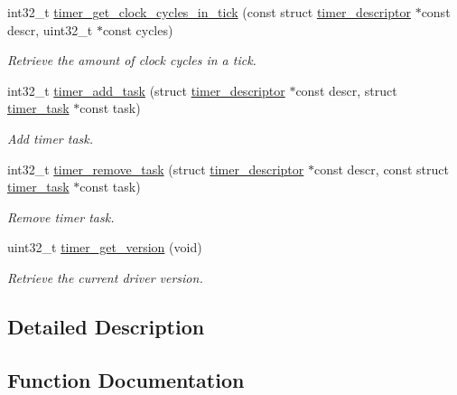 \begin{DoxyCompactItemize}
int32\+\_\+t \hyperlink{group__doc__driver__hal__timer_gadfb41242ed524d44676ef469b6e4d8ba}{timer\+\_\+get\+\_\+clock\+\_\+cycles\+\_\+in\+\_\+tick} (const struct \hyperlink{structtimer__descriptor}{timer\+\_\+descriptor} $\ast$const descr, uint32\+\_\+t $\ast$const cycles)
\begin{DoxyCompactList}\small\item\em Retrieve the amount of clock cycles in a tick. \end{DoxyCompactList}\item 
int32\+\_\+t \hyperlink{group__doc__driver__hal__timer_ga6a3e13f52fc112ac1d11c2615044bdac}{timer\+\_\+add\+\_\+task} (struct \hyperlink{structtimer__descriptor}{timer\+\_\+descriptor} $\ast$const descr, struct \hyperlink{structtimer__task}{timer\+\_\+task} $\ast$const task)
\begin{DoxyCompactList}\small\item\em Add timer task. \end{DoxyCompactList}\item 
int32\+\_\+t \hyperlink{group__doc__driver__hal__timer_gad9ebc284902f8cc56872fe4c28c8f77e}{timer\+\_\+remove\+\_\+task} (struct \hyperlink{structtimer__descriptor}{timer\+\_\+descriptor} $\ast$const descr, const struct \hyperlink{structtimer__task}{timer\+\_\+task} $\ast$const task)
\begin{DoxyCompactList}\small\item\em Remove timer task. \end{DoxyCompactList}\item 
uint32\+\_\+t \hyperlink{group__doc__driver__hal__timer_ga0d15eccf64f5a468c2f359286a2d6682}{timer\+\_\+get\+\_\+version} (void)
\begin{DoxyCompactList}\small\item\em Retrieve the current driver version. \end{DoxyCompactList}\end{DoxyCompactItemize}


\subsection{Detailed Description}


\subsection{Function Documentation}
\mbox{\label{group__doc__driver__hal__timer_ga6a3e13f52fc112ac1d11c2615044bdac}} 
